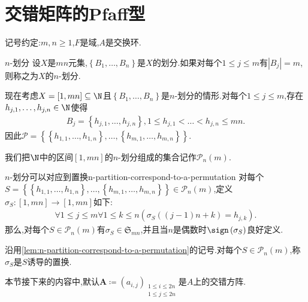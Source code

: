 \section{交错矩阵的Pfaff型}

记号约定:$m,n\geq 1$,$F$是域,$A$是交换环.

\begin{definition}{$n$-划分}{}
	设$X$是$mn$元集,$\left\{B_{1},\ldots,B_{n}\right\}$是$X$的划分.如果对每个$1\leq j\leq m$有$\left|B_{j}\right|=m$,则称之为$X$的$n$-划分.
\end{definition}

\begin{remark}{}{}
	现在考虑$X=\left[1,mn\right]\subseteq\N$且$\left\{B_{1},\ldots,B_{n}\right\}$是$n$-划分的情形.对每个$1\leq j\leq m$,存在$h_{j,1},\ldots,h_{j,n}\in \N$使得
	\begin{align*}
		B_{j}=\left\{h_{j,1},\ldots,h_{j,n}\right\},1\leq h_{j,1}<\ldots<h_{j,n}\leq mn.
	\end{align*}
	因此$\mathcal{P}=\left\{\left\{h_{1,1},\ldots,h_{1,n}\right\},\ldots,\left\{h_{m,1},\ldots,h_{m,n}\right\}\right\}$.
\end{remark}

\begin{definition}{}{}
	我们把$\N$中的区间$\left[1,mn\right]$的$n$-划分组成的集合记作$\mathcal{P}_{n}\left(m\right)$.
\end{definition}

\begin{lemma}{$n$-划分可以对应到置换}{n-partition-correspond-to-a-permutation}
	对每个$S=\left\{\left\{h_{1,1},\ldots,h_{1,n}\right\},\ldots,\left\{h_{m,1},\ldots,h_{m,n}\right\}\right\}\in\mathcal{P}_{n}\left(m\right)$,定义$\sigma_{S}:\left[1,mn\right]\to\left[1,mn\right]$如下:
	\begin{align*}
		\forall 1\leq j\leq m\forall 1\leq k\leq n\left(\sigma_{S}\left(\left(j-1\right)n+k\right)=h_{j,k}\right).
	\end{align*}
	那么,对每个$S\in\mathcal{P}_{n}\left(m\right)$有$\sigma_{S}\in\mathfrak{S}_{mn}$,并且当$n$是偶数时$\sign\left(\sigma_{S}\right)$良好定义.
\end{lemma}

\begin{definition}{}{}
	沿用\ref{lem:n-partition-correspond-to-a-permutation}的记号.对每个$S\in\mathcal{P}_{n}\left(m\right)$,称$\sigma_{S}$是$S$诱导的置换.
\end{definition}

本节接下来的内容中,默认$\boldsymbol{A}\coloneq\left(a_{i,j}\right)_{\substack{1\leq i\leq 2n\\1\leq j\leq 2n}}$是$A$上的交错方阵.

